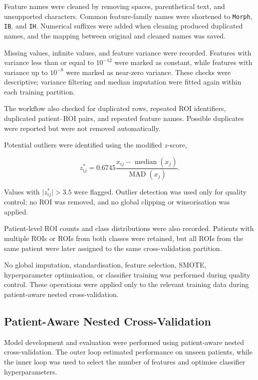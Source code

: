 \documentclass[12pt,twocolumn]{article}
\begin{document}
Feature names were cleaned by removing spaces, parenthetical text, and
unsupported characters. Common feature-family names were shortened to
\texttt{Morph}, \texttt{IB}, and \texttt{IH}. Numerical suffixes were
added when cleaning produced duplicated names, and the mapping between
original and cleaned names was saved.

Missing values, infinite values, and feature variance were recorded.
Features with variance less than or equal to \(10^{-12}\) were marked
as constant, while features with variance up to \(10^{-8}\) were marked
as near-zero variance. These checks were descriptive; variance
filtering and median imputation were fitted again within each training
partition.

The workflow also checked for duplicated rows, repeated ROI
identifiers, duplicated patient--ROI pairs, and repeated feature
names. Possible duplicates were reported but were not removed
automatically.

Potential outliers were identified using the modified \(z\)-score,

\begin{equation}
z^{*}_{ij}
=
0.6745
\frac{x_{ij}-\operatorname{median}(x_j)}
{\operatorname{MAD}(x_j)}.
\label{eq:modified_z_score}
\end{equation}

Values with \(\lvert z^{*}_{ij}\rvert>3.5\) were flagged. Outlier
detection was used only for quality control; no ROI was removed, and no
global clipping or winsorisation was applied.

Patient-level ROI counts and class distributions were also recorded.
Patients with multiple ROIs or ROIs from both classes were retained,
but all ROIs from the same patient were later assigned to the same
cross-validation partition.

No global imputation, standardisation, feature selection, SMOTE,
hyperparameter optimisation, or classifier training was performed
during quality control. These operations were applied only to the
relevant training data during patient-aware nested cross-validation.







\subsection{Patient-Aware Nested Cross-Validation}
\label{subsec:nested_cv}

Model development and evaluation were performed using patient-aware
nested cross-validation. The outer loop estimated performance on
unseen patients, while the inner loop was used to select the number of
features and optimise classifier hyperparameters.
\end{document}
